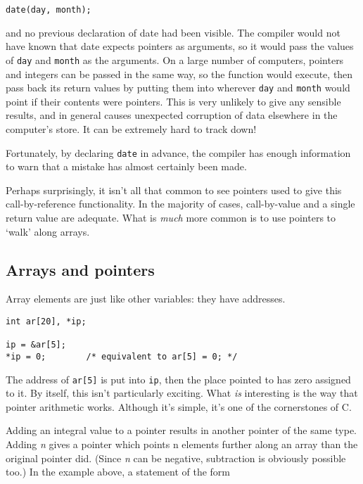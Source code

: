    \begin{Verbatim}
date(day, month);
\end{Verbatim}

   and no previous declaration of date had been visible. The compiler
    would not have known that date expects pointers as arguments, so it
    would pass the \kint{} values of \texttt{day} and
    \texttt{month} as the arguments. On a large number of computers,
    pointers and integers can be passed in the same way, so the function
    would execute, then pass back its return values by putting them into
    wherever \texttt{day} and \texttt{month} would point if their
    contents were pointers. This is very unlikely to give any sensible
    results, and in general causes unexpected corruption of data elsewhere
    in the computer's store. It can be extremely hard to track down!


   Fortunately, by declaring \texttt{date} in advance, the compiler
    has enough information to warn that a mistake has almost certainly been
    made.


   Perhaps surprisingly, it isn't all that common to see pointers used to
    give this call-by-reference functionality. In the majority of cases,
    call-by-value and a single return value are adequate. What is
    \textit{much} more common is to use pointers to `walk' along
    arrays.


  

  \subsection{Arrays and pointers}\label{subsec:arrPtr}
   

   Array elements are just like other variables: they have addresses.


   \begin{Verbatim}
int ar[20], *ip;

ip = &ar[5];
*ip = 0;        /* equivalent to ar[5] = 0; */
\end{Verbatim}

   The address of \texttt{ar[5]} is put into \texttt{ip}, then
    the place pointed to has zero assigned to it. By itself, this isn't
    particularly exciting. What \textit{is} interesting is the way that
    pointer arithmetic works. Although it's simple, it's one of the
    cornerstones of C.


   Adding an integral value to a pointer results in another pointer of
    the same type. Adding \textit{n} gives a pointer which points n elements
    further along an array than the original pointer did. (Since \textit{n}
    can be negative, subtraction is obviously possible too.) In the example
    above, a statement of the form


